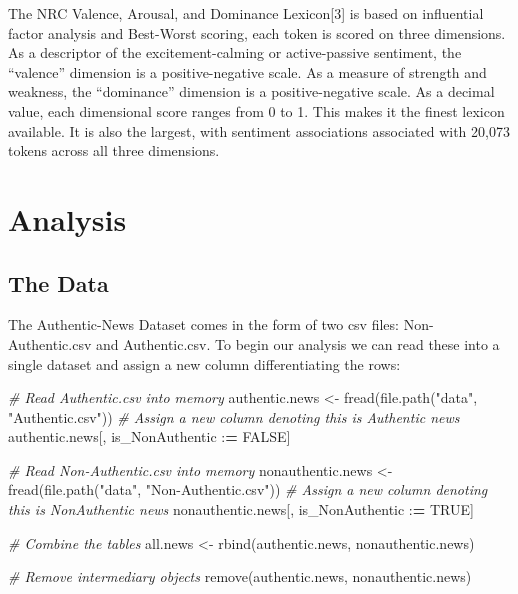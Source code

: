 \documentclass[
]{article}
\newenvironment{Shaded}{\begin{snugshade}}{\end{snugshade}}
\newcommand{\CommentTok}[1]{\textcolor[rgb]{0.56,0.35,0.01}{\textit{#1}}}
\newcommand{\ConstantTok}[1]{\textcolor[rgb]{0.00,0.00,0.00}{#1}}
\newcommand{\ErrorTok}[1]{\textcolor[rgb]{0.64,0.00,0.00}{\textbf{#1}}}
\newcommand{\FunctionTok}[1]{\textcolor[rgb]{0.00,0.00,0.00}{#1}}
\newcommand{\NormalTok}[1]{#1}
\newcommand{\OtherTok}[1]{\textcolor[rgb]{0.56,0.35,0.01}{#1}}
\newcommand{\SpecialCharTok}[1]{\textcolor[rgb]{0.00,0.00,0.00}{#1}}
\newcommand{\StringTok}[1]{\textcolor[rgb]{0.31,0.60,0.02}{#1}}
\begin{document}
The NRC Valence, Arousal, and Dominance Lexicon{[}3{]} is based on
influential factor analysis and Best-Worst scoring, each token is scored
on three dimensions. As a descriptor of the excitement-calming or
active-passive sentiment, the ``valence'' dimension is a
positive-negative scale. As a measure of strength and weakness, the
``dominance'' dimension is a positive-negative scale. As a decimal
value, each dimensional score ranges from 0 to 1. This makes it the
finest lexicon available. It is also the largest, with sentiment
associations associated with 20,073 tokens across all three dimensions.

\pagebreak

\hypertarget{analysis}{%
\section{Analysis}\label{analysis}}

\hypertarget{the-data}{%
\subsection{The Data}\label{the-data}}

The Authentic-News Dataset comes in the form of two csv files:
Non-Authentic.csv and Authentic.csv. To begin our analysis we can read
these into a single dataset and assign a new column differentiating the
rows:

\begin{Shaded}
\begin{Highlighting}[]
\CommentTok{\# Read Authentic.csv into memory}
\NormalTok{authentic.news }\OtherTok{\textless{}{-}} \FunctionTok{fread}\NormalTok{(}\FunctionTok{file.path}\NormalTok{(}\StringTok{"data"}\NormalTok{, }\StringTok{"Authentic.csv"}\NormalTok{))}
\CommentTok{\# Assign a new column denoting this is Authentic news}
\NormalTok{authentic.news[, is\_NonAuthentic }\SpecialCharTok{:}\ErrorTok{=} \ConstantTok{FALSE}\NormalTok{]}

\CommentTok{\# Read Non{-}Authentic.csv into memory}
\NormalTok{nonauthentic.news }\OtherTok{\textless{}{-}} \FunctionTok{fread}\NormalTok{(}\FunctionTok{file.path}\NormalTok{(}\StringTok{"data"}\NormalTok{, }\StringTok{"Non{-}Authentic.csv"}\NormalTok{))}
\CommentTok{\# Assign a new column denoting this is NonAuthentic news}
\NormalTok{nonauthentic.news[, is\_NonAuthentic }\SpecialCharTok{:}\ErrorTok{=} \ConstantTok{TRUE}\NormalTok{]}

\CommentTok{\# Combine the tables}
\NormalTok{all.news }\OtherTok{\textless{}{-}} \FunctionTok{rbind}\NormalTok{(authentic.news, nonauthentic.news)}

\CommentTok{\# Remove intermediary objects}
\FunctionTok{remove}\NormalTok{(authentic.news, nonauthentic.news)}
\end{Highlighting}
\end{Shaded}
\end{document}
